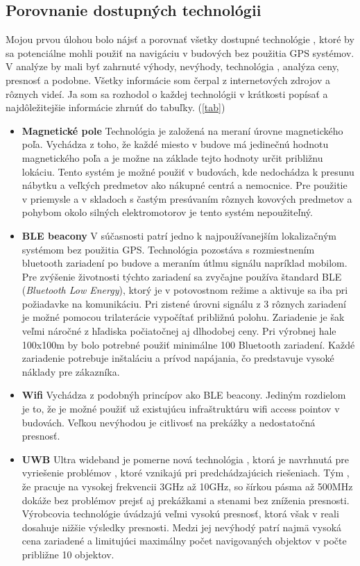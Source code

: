 \documentclass[11pt, oneside]{report}
\begin{document}
\subsection{Porovnanie dostupných technológii}
Mojou prvou úlohou bolo nájsť a  porovnať všetky dostupné technológie , ktoré  by sa potenciálne mohli použiť na navigáciu v budových bez použitia GPS systémov. V analýze by mali byť zahrnuté  výhody, nevýhody,  technológia , analýza ceny, presnosť a podobne. Všetky informácie som čerpal z internetových zdrojov\cite{lee2007comparative} a rôznych videí. Ja som sa rozhodol o každej technológii  v krátkosti popísať a najdôležitejšie informácie zhrnúť do tabuľky. (\ref{tab})
\begin{itemize}
\item\textbf{Magnetické pole} Technológia je založená na  meraní úrovne magnetického poľa. Vychádza z toho, že každé miesto v budove má jedinečnú hodnotu magnetického poľa a je možne na základe tejto hodnoty určit   približnu lokáciu. Tento systém je možné použiť v budovách, kde nedochádza k  presunu nábytku a  veľkých predmetov ako nákupné centrá a nemocnice. Pre použitie v priemysle a v skladoch  s častým presúvaním rôznych kovových predmetov  a pohybom okolo silných elektromotorov je tento systém nepoužiteľný.
\item\textbf{BLE beacony} V súčasnosti patrí jedno k najpoužívanejším  lokalizačným systémom  bez použitia GPS. Technológia pozostáva  s rozmiestnením bluetooth zariadení po budove a meraním útlmu signálu  napríklad mobilom. Pre zvýšenie životnosti týchto zariadení sa zvyčajne používa štandard BLE (\textit{Bluetooth Low Energy}), ktorý je v potovostnom režime a aktivuje sa iba pri požiadavke na komunikáciu. Pri  zistené úrovni signálu z  3 rôznych zariadení je možné pomocou trilaterácie vypočítať približnú polohu. Zariadenie je šak veľmi náročné z hľadiska počiatočnej aj dlhodobej  ceny. Pri výrobnej hale  100x100m by bolo potrebné použiť minimálne 100 Bluetooth zariadení. Každé zariadenie potrebuje inštaláciu a prívod napájania, čo predstavuje vysoké náklady pre zákazníka. 
\item\textbf{Wifi} Vychádza z podobnýh princípov ako BLE beacony. Jediným rozdielom je to, že je možné použiť už existujúcu infraštruktúru wifi access pointov v budovách. Veľkou nevýhodou je citlivosť na prekážky a nedostatočná presnosť.
\item\textbf{UWB} Ultra wideband je  pomerne nová technológia , ktorá je  navrhnutá pre vyriešenie problémov , ktoré vznikajú pri predchádzajúcich riešeniach. Tým , že pracuje na  vysokej frekvencii 3GHz až 10GHz, so šírkou pásma až 500MHz dokáže  bez problémov prejsť aj prekážkami a stenami bez zníženia presnosti. Výrobcovia technológie úvádzajú veľmi vysokú presnosť, ktorá však v reali dosahuje nižšie výsledky presnosti. Medzi jej nevýhodý patrí najmä vysoká cena zariadené a limitujúci maximálny počet  navigovaných objektov v počte približne 10 objektov.

\end{itemize}
\end{document}
